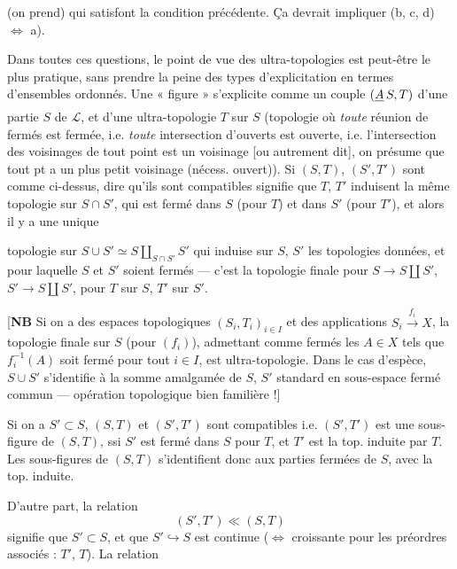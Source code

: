 \documentclass[11pt,a4paper]{article}
\begin{document}
 \struck{\ill{}} (on prend) qui satisfont la condition précédente. Ça devrait impliquer (b, c, d) $\Longleftrightarrow$ a).

Dans toutes ces questions, le point de vue des ultra-topologies  est peut-être le plus pratique, sans prendre la peine des types d'explicitation  en termes d'ensembles  ordonnés. Une « figure » s'explicite comme un couple $(\struck{A}\, S, T)$ d'une partie $S$ de $\mathcal{L}$, et d'une ultra-topologie $T$ sur $S$ (topologie où \emph{toute} réunion de fermés est fermée, i.e. \emph{toute} intersection d'ouverts est ouverte, i.e. l'intersection des voisinages de tout point est un voisinage [ou autrement dit], on présume que tout pt a un plus petit voisinage (nécess. ouvert)). Si $(S,T)$, $(S',T')$ sont comme ci-dessus, dire qu'ils sont compatibles signifie que $T$, $T'$ induisent la même topologie sur $S \cap S'$, qui est fermé dans $S$ (pour $T$) et dans $S'$ (pour $T'$), et alors il y a une unique

topologie sur $S \cup S' \simeq S \amalg_{S \cap S'} S'$ qui  induise sur $S$, $S'$ les topologies données, et pour laquelle $S$ et $S'$ soient fermés — c'est la topologie finale pour $S \to S \amalg S'$, $S' \to S \amalg S'$, pour $T$ sur $S$, $T'$ sur $S'$.

[\textbf{NB} Si on a des espaces topologiques $(S_{i}, T_{i})_{i \in I}$ et des applications $S_{i} \xrightarrow{f_{i}} X$, la topologie finale sur $S$ (pour $(f_{i})$), admettant comme fermés les $A \in X$ tels que $f_{i}^{-1}(A)$ soit fermé pour tout $i \in I$, est  ultra-topologie.  Dans le cas d'espèce, $S \cup S'$ s'identifie à la somme amalgamée de $S$, $S'$ standard en sous-espace fermé commun — opération topologique bien familière !]

Si on a $S' \subset S$, $(S,T)$ et $(S',T')$ sont compatibles i.e. $(S',T')$ est une sous-figure de $(S,T)$, ssi $S'$ est fermé dans $S$ pour $T$, et $T'$ est la top. induite par $T$. Les sous-figures de $(S,T)$ s'identifient donc aux parties fermées de $S$, avec la top. induite.

D'autre part, la relation
\[
  (S',T') \ll (S,T)
\]
signifie que $S' \subset S$, et que $S' \hookrightarrow S$ est continue ($\Longleftrightarrow$ croissante pour les préordres associés : $T'$, $T$). La relation
\end{document}
